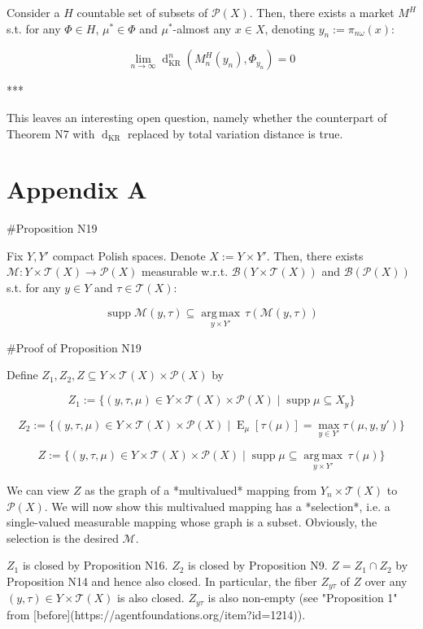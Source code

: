 \documentclass[a4paper]{article}
\DeclareMathOperator{\Supp}{supp}
\DeclareMathOperator{\E}{E}
\newcommand{\Argmax}[1]{\underset{#1}{\operatorname{arg\,max}}\,}
\newcommand{\Prob}{\mathcal{P}}
\newcommand{\T}{\mathcal{T}}
\newcommand{\B}{\mathcal{B}}
\newcommand{\Dkr}{\operatorname{d}_{\text{KR}}}
\begin{document}
Consider a ${H}$ countable set of subsets of ${\Prob(X)}$. Then, there exists a market ${M^H}$ s.t. for any ${\Phi \in H}$, ${\mu^* \in \Phi}$ and ${\mu^*}$-almost any ${x \in X}$, denoting ${y_n:=\pi_{n\omega}(x)}$:

$$\lim_{n \rightarrow \infty} \Dkr^n(M^H_n(y_n),\Phi_{y_n}) = 0$$

***

This leaves an interesting open question, namely whether the counterpart of Theorem N7 with ${\Dkr}$ replaced by total variation distance is true.

\section{Appendix A}

\#Proposition N19

Fix ${Y,Y'}$ compact Polish spaces. Denote ${X:=Y \times Y'}$. Then, there exists ${\mathcal{M}: Y \times \T(X) \rightarrow \Prob(X)}$ measurable w.r.t. ${\B(Y \times \T(X))}$ and ${\B(\Prob(X))}$ s.t. for any ${y \in Y}$ and ${\tau \in \T(X)}$:


$$\Supp \mathcal{M}(y,\tau) \subseteq \Argmax{y \times Y'} \tau(\mathcal{M}(y,\tau))$$

\#Proof of Proposition N19

Define ${Z_1, Z_2, Z \subseteq Y \times \T(X) \times \Prob(X)}$ by

$${Z_1:=\{(y,\tau,\mu) \in Y \times \T(X) \times \Prob(X) \mid \Supp \mu \subseteq X_y\}}$$

$${Z_2:=\{(y,\tau,\mu) \in Y \times \T(X) \times \Prob(X) \mid \E_\mu[\tau(\mu)] = \max_{y \in Y'} \tau(\mu,y,y')\}}$$

$${Z:=\{(y,\tau,\mu) \in Y \times \T(X) \times \Prob(X) \mid \Supp \mu \subseteq \Argmax{y \times Y'} \tau(\mu)\}}$$

We can view ${Z}$ as the graph of a *multivalued* mapping from ${Y_n \times \T(X)}$ to ${\Prob(X)}$. We will now show this multivalued mapping has a *selection*, i.e. a single-valued measurable mapping whose graph is a subset. Obviously, the selection is the desired ${\mathcal{M}}$.

${Z_1}$ is closed by Proposition N16. ${Z_2}$ is closed by Proposition N9. ${Z = Z_1 \cap Z_2}$ by Proposition N14 and hence also closed. In particular, the fiber ${Z_{y\tau}}$ of ${Z}$ over any ${(y,\tau) \in Y \times \T(X)}$ is also closed. ${Z_{y\tau}}$ is also non-empty (see "Proposition 1" from [before](https://agentfoundations.org/item?id=1214)).
\end{document}
